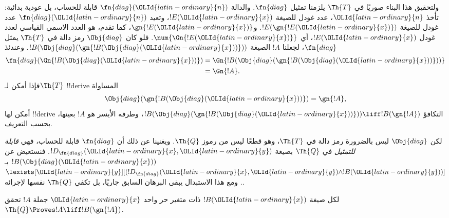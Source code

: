 \documentclass[../../../include/open-logic-section]{subfiles}
\begin{document}
\begin{explain}
ولتحقيق هذا البناء صوريًا في $\Th{T}$ يلزمنا تمثيل
$\fn{diag}$. والدالة $\fn{diag}({\OLId{latin-ordinary}{n}})$ قابلة للحساب، بل عودية
بدائية: تأخذ ${\OLId{latin-ordinary}{n}}$، عدد غودل للصيغة $!E({\OLId{latin-ordinary}{x}})$، وتعيد
$\fn{diag}({\OLId{latin-ordinary}{n}})$ عدد غودل للصيغة $!E(\gn{!E({\OLId{latin-ordinary}{x}})})$.
و$\gn{!E({\OLId{latin-ordinary}{x}})}$، كما تقدم، هو العدد الاسمي القياسي لعدد غودل
$!E({\OLId{latin-ordinary}{x}})$، أي $\num{\Gn{!E({\OLId{latin-ordinary}{x}})}}$. فلو كان $\Obj{diag}$ رمز
دالة في $\Th{T}$ يمثل $\fn{diag}$، لجعلنا $!A$ الصيغة
$!B(\Obj{diag}(\gn{!B(\Obj{diag}({\OLId{latin-ordinary}{x}}))}))$. وعندئذ
\begin{align*}
\fn{diag}(\Gn{!B(\Obj{diag}({\OLId{latin-ordinary}{x}}))}) & =
\Gn{!B(\Obj{diag}(\gn{!B(\Obj{diag}({\OLId{latin-ordinary}{x}}))}))} \\
& = \Gn{!A}.
\end{align*}
فإذا أمكن لـ$\Th{T}$ !!{derive} المساواة
\[
\Obj{diag}(\gn{!B(\Obj{diag}({\OLId{latin-ordinary}{x}}))}) = \gn{!A},
\]
أمكن لها !!{derive} التكافؤ
$!B(\Obj{diag}(\gn{!B(\Obj{diag}({\OLId{latin-ordinary}{x}}))}))\liff !B(\gn{!A})$،
وطرفه الأيسر هو $!A$ بعينها، بحسب التعريف.

لكن $\Obj{diag}$ ليس بالضرورة رمز دالة في $\Th{T}$،
وهو قطعًا ليس من رموز $\Th{Q}$. ويغنينا عن ذلك أن $\fn{diag}$
قابلة للحساب، فهي \emph{قابلة للتمثيل} في $\Th{Q}$ بصيغة
$!D_{\fn{diag}}({\OLId{latin-ordinary}{x}},{\OLId{latin-ordinary}{y}})$. فنستعيض عن $!B(\Obj{diag}({\OLId{latin-ordinary}{x}}))$
بـ$\lexists[{\OLId{latin-ordinary}{y}}][(!D_{\fn{diag}}({\OLId{latin-ordinary}{x}},{\OLId{latin-ordinary}{y}})\land !B({\OLId{latin-ordinary}{y}}))]$.
ومع هذا الاستبدال يبقى البرهان السابق جاريًا، بل تكفي
$\Th{Q}$ نفسها لإجرائه.
\end{explain}

\begin{lem}
 لكل صيغة $!B({\OLId{latin-ordinary}{x}})$ ذات متغير حر واحد
${\OLId{latin-ordinary}{x}}$ جملة $!A$ تحقق
$\Th{Q}\Proves !A\liff !B(\gn{!A})$.
\end{lem}
\end{document}
